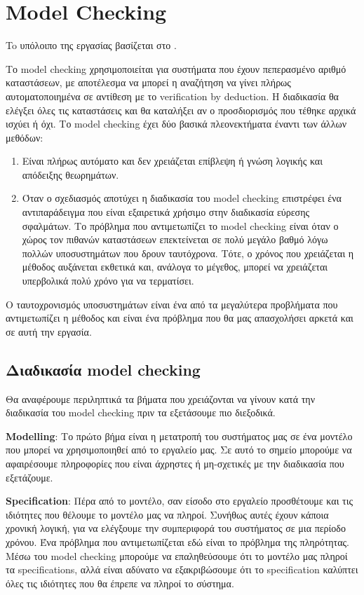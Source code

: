 \documentclass{article}
\newcommand{\english}[1]{\foreignlanguage{english}{{#1}}}
\begin{document}
\section*{\english{Model Checking}}

To υπόλοιπο της εργασίας βασίζεται στο \cite{model}.

Το \english{model checking} χρησιμοποιείται για συστήματα που έχουν πεπερασμένο αριθμό καταστάσεων, με αποτέλεσμα να μπορεί η αναζήτηση να γίνει πλήρως αυτοματοποιημένα σε αντίθεση με το \english{verification by deduction}. Η διαδικασία θα ελέγξει όλες τις καταστάσεις και θα καταλήξει αν ο προσδιορισμός που τέθηκε αρχικά ισχύει ή όχι.
Το \english{model checking} έχει δύο βασικά πλεονεκτήματα έναντι των άλλων μεθόδων:

\begin{enumerate}
    \item Είναι πλήρως αυτόματο και δεν χρειάζεται επίβλεψη ή γνώση λογικής και απόδειξης θεωρημάτων.
    \item 	Όταν ο σχεδιασμός αποτύχει η διαδικασία του \english{model checking} επιστρέφει ένα αντιπαράδειγμα που είναι εξαιρετικά χρήσιμο στην διαδικασία εύρεσης σφαλμάτων. Το πρόβλημα που αντιμετωπίζει το \english{model checking} είναι όταν ο χώρος τον πιθανών καταστάσεων επεκτείνεται σε πολύ μεγάλο βαθμό λόγω πολλών υποσυστημάτων που δρουν ταυτόχρονα. Τότε, ο χρόνος που χρειάζεται η μέθοδος αυξάνεται εκθετικά και, ανάλογα το μέγεθος, μπορεί να χρειάζεται υπερβολικά πολύ χρόνο για να τερματίσει.
\end{enumerate}

Ο ταυτοχρονισμός υποσυστημάτων είναι ένα από τα μεγαλύτερα προβλήματα που αντιμετωπίζει η μέθοδος και είναι ένα πρόβλημα που θα μας απασχολήσει αρκετά και σε αυτή την εργασία. 

\subsection*{Διαδικασία \english{model checking}}

Θα αναφέρουμε περιληπτικά τα βήματα που χρειάζονται να γίνουν κατά την διαδικασία του \english{model checking} πριν τα εξετάσουμε πιο διεξοδικά.

\english{\textbf{Modelling}}: Το πρώτο βήμα είναι η μετατροπή του συστήματος μας σε ένα μοντέλο που μπορεί να χρησιμοποιηθεί από το εργαλείο μας. Σε αυτό το σημείο μπορούμε να αφαιρέσουμε πληροφορίες που είναι άχρηστες ή μη-σχετικές με την διαδικασία που εξετάζουμε.

\english{\textbf{Specification}}: Πέρα από το μοντέλο, σαν είσοδο στο εργαλείο προσθέτουμε και τις ιδιότητες που θέλουμε το μοντέλο μας να πληροί. Συνήθως αυτές έχουν κάποια χρονική λογική, για να ελέγξουμε την συμπεριφορά του συστήματος σε μια περίοδο χρόνου. Ένα πρόβλημα που αντιμετωπίζεται εδώ είναι το πρόβλημα της πληρότητας. Μέσω του \english{model checking} μπορούμε να επαληθεύσουμε ότι το μοντέλο μας πληροί τα \english{specifications}, αλλά είναι αδύνατο να εξακριβώσουμε ότι το \english{specification} καλύπτει όλες τις ιδιότητες που θα έπρεπε να πληροί το σύστημα.
\end{document}
